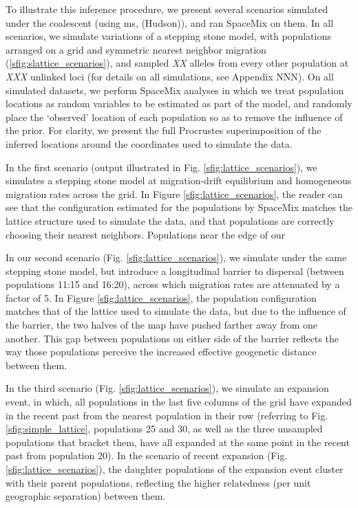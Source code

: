\documentclass[12pt]{article}
\newcommand{\gb}[1]{{\em \color{magenta} #1}}
\newcommand{\gc}[1]{{\em \color{blue} #1}}
\begin{document}

To illustrate this inference procedure, we present several scenarios simulated under the coalescent (using \textrm{ms}, (Hudson)), and ran SpaceMix on them.  In all scenarios, we simulate variations of a stepping stone model, with populations arranged on a grid and symmetric nearest neighbor migration (\ref{sfig:slattice_scenarios}), and sampled \gc{XX} alleles 
from every other population at \gc{XXX} unlinked loci (for details on all simulations, see Appendix NNN). On all simulated datasets, we perform SpaceMix analyses in which we treat population locations as random variables to be estimated as part of the model, and randomly place the `observed' location of each population so as to remove the influence of the prior.  For clarity, we present the full Procrustes superimposition of the inferred locations around the coordinates used to simulate the data.


In the first scenario (output illustrated in Fig. \ref{sfig:lattice_scenarios}), we simulates a stepping stone model at migration-drift equilibrium and homogeneous migration rates across the grid. In Figure \ref{sfig:lattice_scenarios}, the reader can see that the configuration estimated for the populations by SpaceMix matches the lattice structure used to simulate the data, and that populations are correctly choosing their nearest neighbors. Populations near the edge of our 

 In our second scenario (Fig. \ref{sfig:lattice_scenarios}), we simulate under the same stepping stone model, but introduce a longitudinal barrier to dispersal (between populations 11:15 and 16:20), across which migration rates are attenuated by a factor of 5.  In Figure \ref{sfig:lattice_scenarios}, the population configuration matches that of the lattice used to simulate the data, but due to the influence of the barrier, the two halves of the map have pushed farther away from one another.  This gap between populations on either side of the barrier reflects the way those populations perceive the increased effective geogenetic distance between them. 

 In the third scenario (Fig. \ref{sfig:lattice_scenarios}), we simulate an expansion event, in which, all populations in the last five columns of the grid have expanded in the recent past from the nearest population in their row (referring to Fig. \ref{sfig:simple_lattice}, populations 25 and 30, as well as the three unsampled populations that bracket them, have all expanded at the same point in the recent past from population 20). In the scenario of recent expansion (Fig. \ref{sfig:lattice_scenarios}), the daughter populations of the expansion event cluster with their parent populations, reflecting the higher relatedness (per unit geographic separation) between them.
\end{document}
